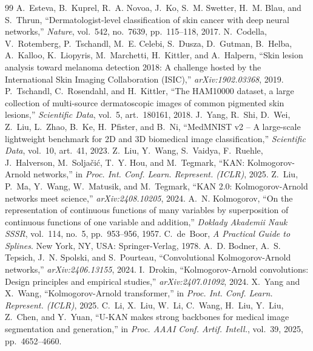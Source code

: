 \documentclass[conference]{IEEEtran}
\begin{document}
\begin{thebibliography}{99}
\footnotesize
{} A.~Esteva, B.~Kuprel, R.~A. Novoa, J.~Ko, S.~M. Swetter, H.~M. Blau, and S.~Thrun, ``Dermatologist-level classification of skin cancer with deep neural networks,'' \emph{Nature}, vol.~542, no.~7639, pp.~115--118, 2017.
 N.~Codella, V.~Rotemberg, P.~Tschandl, M.~E. Celebi, S.~Dusza, D.~Gutman, B.~Helba, A.~Kalloo, K.~Liopyris, M.~Marchetti, H.~Kittler, and A.~Halpern, ``Skin lesion analysis toward melanoma detection 2018: A challenge hosted by the International Skin Imaging Collaboration (ISIC),'' \emph{arXiv:1902.03368}, 2019.
 P.~Tschandl, C.~Rosendahl, and H.~Kittler, ``The HAM10000 dataset, a large collection of multi-source dermatoscopic images of common pigmented skin lesions,'' \emph{Scientific Data}, vol.~5, art.~180161, 2018.
 J.~Yang, R.~Shi, D.~Wei, Z.~Liu, L.~Zhao, B.~Ke, H.~Pfister, and B.~Ni, ``MedMNIST v2 -- A large-scale lightweight benchmark for 2D and 3D biomedical image classification,'' \emph{Scientific Data}, vol.~10, art.~41, 2023.
 Z.~Liu, Y.~Wang, S.~Vaidya, F.~Ruehle, J.~Halverson, M.~Solja\v{c}i\'{c}, T.~Y. Hou, and M.~Tegmark, ``KAN: Kolmogorov-Arnold networks,'' in \emph{Proc. Int. Conf. Learn. Represent. (ICLR)}, 2025.
 Z.~Liu, P.~Ma, Y.~Wang, W.~Matusik, and M.~Tegmark, ``KAN 2.0: Kolmogorov-Arnold networks meet science,'' \emph{arXiv:2408.10205}, 2024.
 A.~N. Kolmogorov, ``On the representation of continuous functions of many variables by superposition of continuous functions of one variable and addition,'' \emph{Doklady Akademii Nauk SSSR}, vol.~114, no.~5, pp.~953--956, 1957.
 C.~de~Boor, \emph{A Practical Guide to Splines}. New York, NY, USA: Springer-Verlag, 1978.
 A.~D. Bodner, A.~S. Tepsich, J.~N. Spolski, and S.~Pourteau, ``Convolutional Kolmogorov-Arnold networks,'' \emph{arXiv:2406.13155}, 2024.
 I.~Drokin, ``Kolmogorov-Arnold convolutions: Design principles and empirical studies,'' \emph{arXiv:2407.01092}, 2024.
 X.~Yang and X.~Wang, ``Kolmogorov-Arnold transformer,'' in \emph{Proc. Int. Conf. Learn. Represent. (ICLR)}, 2025.
 C.~Li, X.~Liu, W.~Li, C.~Wang, H.~Liu, Y.~Liu, Z.~Chen, and Y.~Yuan, ``U-KAN makes strong backbones for medical image segmentation and generation,'' in \emph{Proc. AAAI Conf. Artif. Intell.}, vol.~39, 2025, pp.~4652--4660.

\end{thebibliography}
\end{document}
